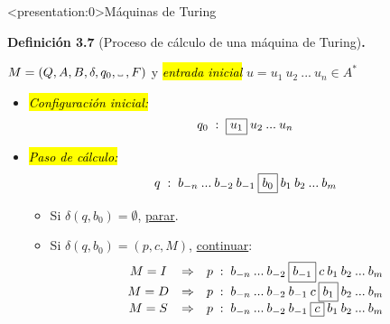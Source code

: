 \documentclass[10pt,xcolor=dvipsnames,aspectratio=169,spanish]{beamer}
\makeatletter
\let\HL\hl
\renewcommand\hl{%
  \let\set@color\beamerorig@set@color
  \let\reset@color\beamerorig@reset@color
  \HL}
\newcommand{\hle}[1]{\hl{\emph{#1}}}
\newcommand\Vtextvisiblespace[1][.3em]{%
\mbox{\kern.06em\vrule height.3ex}%
\vbox{\hrule width#1}%
\hbox{\vrule height.3ex}}
\makeatother
\begin{document}
\begin{frame}<presentation:0>{Máquinas de Turing}

\textbf{Definición 3.7} (Proceso de cálculo de una máquina de Turing)\textbf{.}

$M=(Q, A, B, \delta, q_0, \Vtextvisiblespace\:, F)$ y \hle{entrada inicial} $u = u_1\:u_2\:...\:u_n\in A^*$

\begin{itemize}
    \item \hle{Configuración inicial:} $$q_0\;:\;\fbox{$u_1$}\:u_2\:...\:u_n$$
    \item \hle{Paso de cálculo:} $$q\;:\;b_{-n}\:...\:b_{-2}\:b_{-1}\:\fbox{$b_0$}\:b_1\:b_2\:...\:b_m$$

    \begin{itemize}
        \item Si $\delta(q,b_0)=\emptyset$, \ul{parar}.
        \item Si $\delta(q,b_0)=(p,c,M)$, \ul{continuar}:
        $$
        \begin{matrix}
            M=I&\Rightarrow&p\;:\;b_{-n}\:...\:b_{-2}\:\fbox{$b_{-1}$}\:c\:b_1\:b_2\:...\:b_m\\
            M=D&\Rightarrow&p\;:\;b_{-n}\:...\:b_{-2}\:b_{-1}\:c\:\fbox{$b_1$}\:b_2\:...\:b_m\\
            M=S&\Rightarrow&p\;:\;b_{-n}\:...\:b_{-2}\:b_{-1}\:\fbox{$c$}\:b_1\:b_2\:...\:b_m
        \end{matrix}
    $$
    \end{itemize}
\end{itemize}

\end{frame}
\end{document}
